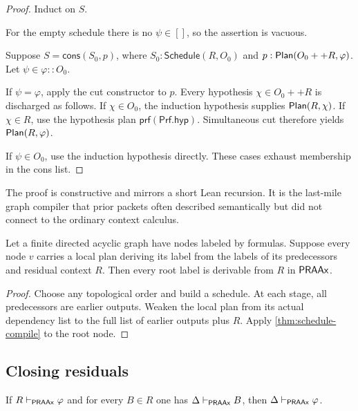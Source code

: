 \begin{proof}
Induct on \(S\).

For the empty schedule there is no \(\psi\in[]\), so the assertion is vacuous.

Suppose \(S=\mathsf{cons}(S_0,p)\), where
\(S_0:\mathsf{Schedule}(R,O_0)\) and
\(p:\mathsf{Plan}(O_0++R,\varphi)\).  Let \(\psi\in\varphi::O_0\).

If \(\psi=\varphi\), apply the cut constructor to \(p\).  Every hypothesis
\(\chi\in O_0++R\) is discharged as follows.  If \(\chi\in O_0\), the induction hypothesis supplies
\(\mathsf{Plan}(R,\chi)\).  If \(\chi\in R\), use the hypothesis plan
\(\mathsf{prf}(\mathsf{Prf.hyp})\).  Simultaneous cut therefore yields
\(\mathsf{Plan}(R,\varphi)\).

If \(\psi\in O_0\), use the induction hypothesis directly.  These cases exhaust membership in the
cons list.
\end{proof}

The proof is constructive and mirrors a short Lean recursion.  It is the last-mile graph compiler
that prior packets often described semantically but did not connect to the ordinary context calculus.

\begin{corollary}\label{cor:dag}
Let a finite directed acyclic graph have nodes labeled by formulas.  Suppose every node \(v\) carries
a local plan deriving its label from the labels of its predecessors and residual context \(R\).  Then
every root label is derivable from \(R\) in \(\mathsf{PRAAx}\).
\end{corollary}

\begin{proof}
Choose any topological order and build a schedule.  At each stage, all predecessors are earlier
outputs.  Weaken the local plan from its actual dependency list to the full list of earlier outputs
plus \(R\).  Apply \cref{thm:schedule-compile} to the root node.
\end{proof}

\subsection{Closing residuals}

\begin{theorem}\label{thm:residual-close}
If \(R\vdash_{\mathsf{PRAAx}}\varphi\) and for every \(B\in R\) one has
\(\Delta\vdash_{\mathsf{PRAAx}}B\), then \(\Delta\vdash_{\mathsf{PRAAx}}\varphi\).
\end{theorem}

